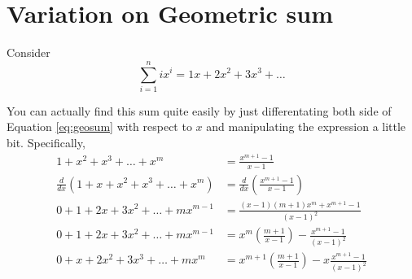 \documentclass[a4paper, 12pt]{article}
\begin{document}
\section*{Variation on Geometric sum}

Consider
\[
	\sum^{n}_{i=1} ix^i = 1x + 2x^2 + 3x^3 + \ldots
\]

You can actually find this sum quite easily by just differentating both side of Equation \ref{eq:geosum} with respect to $x$ and manipulating the expression a little bit. Specifically,
\begin{align*}
1 + x^2 + x^3 + \ldots + x^m &= \frac{x^{m+1}-1}{x-1}\\
\frac{d}{dx} \left( 1 + x + x^2 + x^3 + \ldots + x^m \right) &= \frac{d}{dx} \left(\frac{x^{m+1}-1}{x-1}\right)\\
0 + 1+ 2x + 3x^2 + \ldots + mx^{m-1} &= \frac{(x-1)(m+1)x^m +x^{m+1}-1 }{(x-1)^2}\\
0 + 1 + 2x + 3x^2 + \ldots + mx^{m-1} &= x^m \left(\frac{m+1}{x-1}\right)  -\frac{x^{m+1}-1}{(x-1)^2}\\
0 + x + 2x^2 + 3x^3 + \ldots + m x^m & = x^{m+1} \left(\frac{m+1}{x-1}\right)  -x\frac{x^{m+1}-1}{(x-1)^2}
\end{align*}
\end{document}
